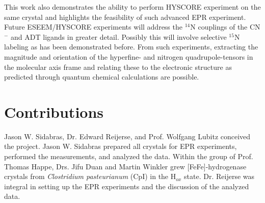 This work also demonstrates the ability to perform HYSCORE experiment on the same crystal and highlights the feasibility of such advanced EPR experiment. Future ESEEM/HYSCORE experiments will address the $^{14}$N couplings of the CN$^-$ and ADT ligands in greater detail. Possibly this will involve selective $^{15}$N labeling as has been demonstrated before. \cite{Adamska2015, AdamskaBridgingAmine} From such experiments, extracting the magnitude and orientation of the hyperfine- and nitrogen quadrupole-tensors in the molecular axis frame and relating these to the electronic structure as predicted through quantum chemical calculations are possible. 

\section*{Contributions} Jason W. Sidabras, Dr. Edward Reijerse, and Prof. Wolfgang Lubitz conceived the project. Jason W. Sidabras prepared all crystals for EPR experiments, performed the measurements, and analyzed the data. Within the group of Prof. Thomas Happe, Drs. Jifu Duan and Martin Winkler grew [FeFe]-hydrogenase crystals from {\em Clostridium pasteurianum} (CpI) in the H$_{ox}$ state. Dr. Reijerse was integral in setting up the EPR experiments and the discussion of the analyzed data. 


{\renewcommand{\bibsection}{\clearpage\section*{\bibname}\markboth{\bibname}{\bibname}}
\renewcommand{\bibname}{CHAPTER 6. REFERENCES}


}